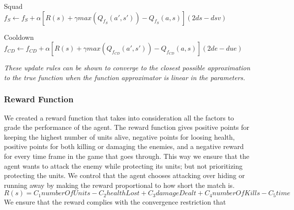 \begin{flushleft}
Squad  \\ 
$f_{S}  \leftarrow f_{S}  + \alpha [ R(s) + \gamma max(Q_f_{S} (a',s'))-Q_f_{S} (a,s) ] (2ds - dsv)$
\end{flushleft} 

\begin{flushleft}
Cooldown  \\ 
$f_{CD}  \leftarrow f_{CD}  + \alpha [ R(s) + \gamma max(Q_f_{CD} (a',s'))-Q_f_{CD} (a,s) ](2de - due)$ 
\end{flushleft} 



\textit{These update rules can be shown to converge to the closest possible approximation to the true function when the function approximator is linear in the parameters. }\cite[p779]{rl}


\subsubsection{Reward Function}

We created a reward function that takes into consideration all the factors to grade the performance of the agent. The reward function gives positive points for keeping the highest number of units alive, negative points for loosing health, positive points for both killing or damaging the enemies, and a negative reward for every time frame in the game that goes through. This way we ensure that the agent wants to attack the enemy while protecting its units; but not prioritizing protecting the units. We control that the agent chooses attacking over hiding or running away by making the reward proportional to how short the match is. \\ 

$R(s) = C_1 numberOfUnits  -  C_2 healthLost  +   C_3 damageDealt  +   C_4 numberOfKills -  C_5 time$ \\ 

We ensure that the reward complies with the convergence restriction that





